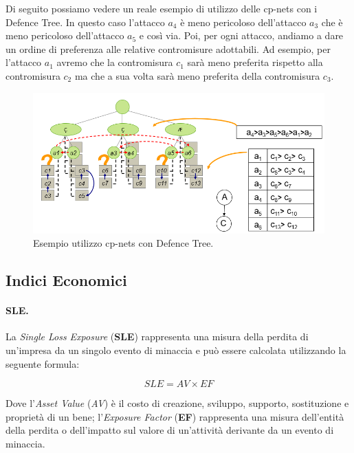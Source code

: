 Di seguito possiamo vedere un reale esempio di utilizzo delle cp-nets con i Defence Tree. In questo caso l'attacco  \emph{\textbf{$a_4$}} è meno pericoloso dell'attacco \emph{\textbf{$a_3$}} che è meno pericoloso dell'attacco \emph{\textbf{$a_5$}} e così via. Poi, per ogni attacco, andiamo a dare un ordine di preferenza alle relative contromisure adottabili. Ad esempio, per l'attacco \emph{\textbf{$a_1$}} avremo che la contromisura \emph{\textbf{$c_1$}} sarà meno preferita rispetto alla contromisura \emph{\textbf{$c_2$}} ma che a sua volta sarà meno preferita della contromisura \emph{\textbf{$c_3$}}.

\begin{figure}[H]
	\centering
	\includegraphics[width=12cm, keepaspectratio]{capitoli/risks/imgs/cp-nets_con_defence_tree.png}
	\caption{Esempio utilizzo cp-nets con Defence Tree.}
	\label{fig:cp-nets_con_defence_tree}
\end{figure}

\subsection{Indici Economici}

\paragraph{SLE.}
La \textit{Single Loss Exposure} (\textbf{SLE}) rappresenta una misura della
perdita di un'impresa da un singolo
evento di minaccia e può essere calcolata utilizzando la seguente formula:

\[
    SLE = AV \times  EF
\]

Dove l'\textit{Asset Value} (\textit{AV}) è il costo di creazione, sviluppo,
supporto, sostituzione e proprietà di un bene;
l'\textit{Exposure Factor} (\textbf{EF}) rappresenta una misura dell'entità della
perdita o dell'impatto sul
valore di un'attività derivante da un evento di minaccia.

